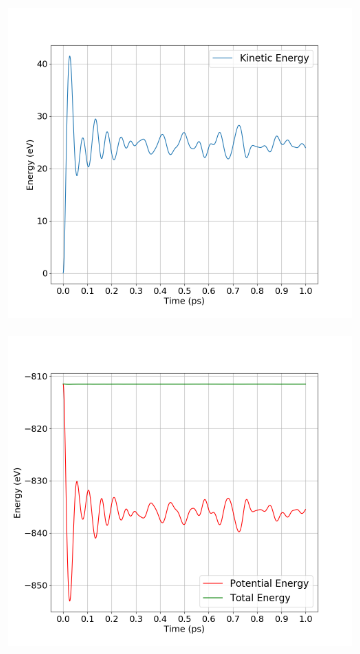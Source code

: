 \begin{figure}[!htbp]
	\begin{subfigure}[b]{0.5\textwidth}
		\includegraphics[width=\textwidth]{figs/k-dt=0.001-middle.png} 
		\caption{}
	\end{subfigure}%
	\begin{subfigure}[b]{0.5\textwidth}
		\includegraphics[width=\textwidth]{figs/e-p-dt=0.001-middle.png} 

\end{subfigure}
\end{figure}
